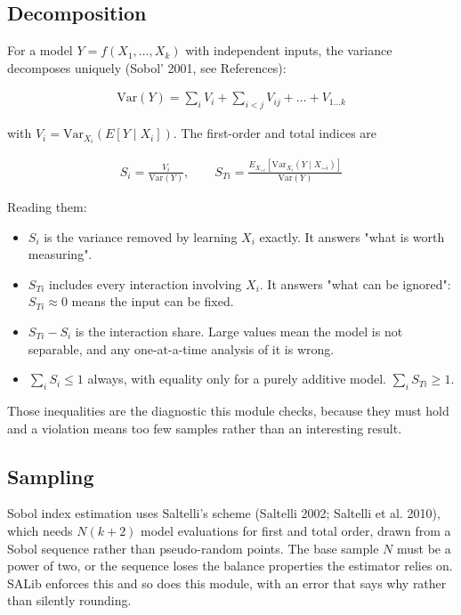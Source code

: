 \documentclass[10pt,a4paper,twoside]{report}
\begin{document}
\subsection*{Decomposition}

For a model $Y = f(X_1, \dots, X_k)$ with independent inputs, the variance decomposes uniquely (Sobol' 2001, see References):

\begin{equation*}
\begin{gathered}
\mathrm{Var}(Y) = \sum_i V_i + \sum_{i<j} V_{ij} + \dots + V_{1\dots k}
\end{gathered}
\end{equation*}

with $V_i = \mathrm{Var}_{X_i}(E[Y \mid X_i])$. The first-order and total indices are

\begin{equation*}
\begin{gathered}
S_i = \frac{V_i}{\mathrm{Var}(Y)}, \qquad S_{Ti} = \frac{E_{X_{\sim i}}[\mathrm{Var}_{X_i}(Y \mid X_{\sim i})]} {\mathrm{Var}(Y)}
\end{gathered}
\end{equation*}

Reading them:

\begin{itemize}
\item $S_i$ is the variance removed by learning $X_i$ exactly. It answers "what is worth measuring".
\item $S_{Ti}$ includes every interaction involving $X_i$. It answers "what can be ignored": $S_{Ti} \approx 0$ means the input can be fixed.
\item $S_{Ti} - S_i$ is the interaction share. Large values mean the model is not separable, and any one-at-a-time analysis of it is wrong.
\item $\sum_i S_i \le 1$ always, with equality only for a purely additive model. $\sum_i S_{Ti} \ge 1$.
\end{itemize}

Those inequalities are the diagnostic this module checks, because they must hold and a violation means too few samples rather than an interesting result.

\subsection*{Sampling}

Sobol index estimation uses Saltelli's scheme (Saltelli 2002; Saltelli et al. 2010), which needs $N(k+2)$ model evaluations for first and total order, drawn from a Sobol sequence rather than pseudo-random points. The base sample $N$ must be a power of two, or the sequence loses the balance properties the estimator relies on. SALib enforces this and so does this module, with an error that says why rather than silently rounding.
\end{document}
